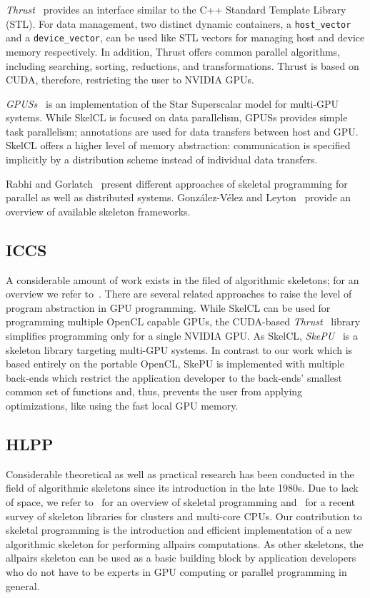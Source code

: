 \emph{Thrust}~\cite{BellHo2011} provides an interface similar to the C++ Standard Template Library (STL).
For data management, two distinct dynamic containers, a \texttt{host\_vector} and a \texttt{device\_vector}, can be used like STL vectors for managing host and device memory respectively.
In addition, Thrust offers common parallel algorithms, including searching, sorting, reductions, and transformations.
Thrust is based on CUDA, therefore, restricting the user to NVIDIA GPUs.

\emph{GPUSs}~\cite{AyBILMQ-09} is an implementation of the Star Superscalar model for multi-GPU systems.
While SkelCL is focused on data parallelism, GPUSs provides simple task parallelism;
annotations are used for data transfers between host and GPU.
SkelCL offers a higher level of memory abstraction: communication is specified implicitly by a distribution scheme instead of individual data transfers.

Rabhi and Gorlatch~\cite{RaG-03} present different approaches of skeletal programming for parallel as well as distributed systems.
Gonz\'{a}lez-V\'{e}lez and Leyton~\cite{GoL-10} provide an overview of available skeleton frameworks.

\subsection{ICCS}
A considerable amount of work exists in the filed of algorithmic skeletons;
for an overview we refer to~\cite{gc11}.
There are several related approaches to raise the level of program abstraction in GPU programming.
While SkelCL can be used for programming multiple OpenCL capable GPUs, the CUDA-based \emph{Thrust}~\cite{BellHo2011} library simplifies programming only for a single NVIDIA GPU.
As SkelCL, \emph{SkePU}~\cite{EnK-10} is a skeleton library targeting multi-GPU systems.
In contrast to our work which is based entirely on the portable OpenCL, SkePU is implemented with multiple back-ends which restrict the application developer to the back-ends' smallest common set of functions and, thus, prevents the user from applying optimizations, like using the fast local GPU memory.

\subsection{HLPP}
Considerable theoretical as well as practical research has been conducted in the field of algorithmic skeletons since its introduction in the late 1980s.
Due to lack of space, we refer to~\cite{GoC-11} for an overview of skeletal programming and~\cite{gl10} for a recent survey of skeleton libraries for clusters and multi-core CPUs.
Our contribution to skeletal programming is the introduction and efficient implementation of a new algorithmic skeleton for performing allpairs computations.
As other skeletons, the allpairs skeleton can be used as a basic building block by application developers who do not have to be experts in GPU computing or parallel programming in general.

